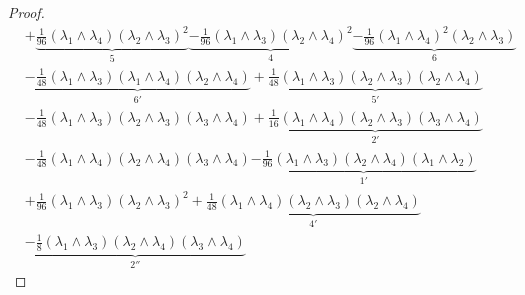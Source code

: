 \documentclass[11pt]{amsart}
\theoremstyle{definition}
\theoremstyle{remark}
\numberwithin{equation}{section}
\begin{document}
\begin{proof}
\begin{align*}
& +\underbrace{\frac{1}{96}\left(\lambda_1 \wedge \lambda_4\right)\left(\lambda_2 \wedge \lambda_3\right)^2}_{\boxed{5}}\underbrace{-\frac{1}{96}\left(\lambda_1 \wedge \lambda_3\right)\left(\lambda_2 \wedge \lambda_4\right)^2}_{\boxed{4}}\underbrace{-\frac{1}{96}\left(\lambda_1 \wedge \lambda_4\right)^2\left(\lambda_2 \wedge \lambda_3\right)}_{\boxed{6}} \\
& \underbrace{-\frac{1}{48}\left(\lambda_1 \wedge \lambda_3\right)\left(\lambda_1 \wedge \lambda_4\right)\left(\lambda_2 \wedge \lambda_4\right)}_{\boxed{6'}}+\underbrace{\frac{1}{48}\left(\lambda_1 \wedge \lambda_3\right)\left(\lambda_2 \wedge \lambda_3\right)\left(\lambda_2 \wedge \lambda_4\right) }_{\boxed{5'}}\\
& -\frac{1}{48}\left(\lambda_1 \wedge \lambda_3\right)\left(\lambda_2 \wedge \lambda_3\right)\left(\lambda_3 \wedge \lambda_4\right)+\underbrace{\frac{1}{16}\left(\lambda_1 \wedge \lambda_4\right)\left(\lambda_2 \wedge \lambda_3\right)\left(\lambda_3 \wedge \lambda_4\right) }_{\boxed{2'}}\\
& -\frac{1}{48}\left(\lambda_1 \wedge \lambda_4\right)\left(\lambda_2 \wedge \lambda_4\right)\left(\lambda_3 \wedge \lambda_4\right)\underbrace{-\frac{1}{96}\left(\lambda_1 \wedge \lambda_3\right)\left(\lambda_2 \wedge \lambda_4\right)\left(\lambda_1 \wedge \lambda_2\right) }_{\boxed{1'}}\\
& +\frac{1}{96}\left(\lambda_1 \wedge \lambda_3\right)\left(\lambda_2 \wedge \lambda_3\right)^2+\underbrace{\frac{1}{48}\left(\lambda_1 \wedge \lambda_4\right)\left(\lambda_2 \wedge \lambda_3\right)\left(\lambda_2 \wedge \lambda_4\right) }_{\boxed{4'}}\\
& \underbrace{-\frac{1}{8}\left(\lambda_1 \wedge \lambda_3\right)\left(\lambda_2 \wedge \lambda_4\right)\left(\lambda_3 \wedge \lambda_4\right)}_{\boxed{2''}}
\end{align*}


\end{proof}
\end{document}
